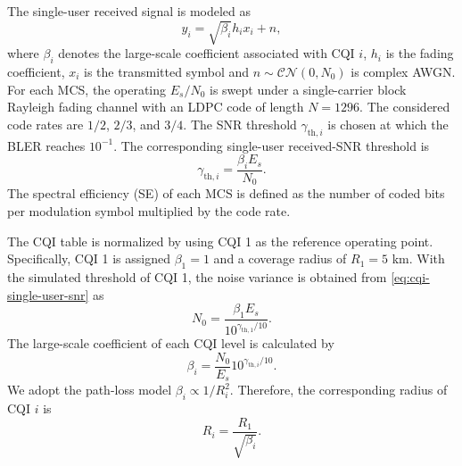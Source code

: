 The single-user received signal is modeled as
\begin{equation}
    y_i=\sqrt{\beta_i}h_i x_i+n,
\end{equation}
where $\beta_i$ denotes the large-scale coefficient associated with CQI $i$, 
$h_i$ is the fading coefficient, 
$x_i$ is the transmitted symbol and $n \sim \mathcal{CN}(0,N_0)$ is complex AWGN. 
For each MCS, the operating $E_s/N_0$ is swept under a single-carrier block Rayleigh fading channel with an LDPC code of length $N=1296$. The considered code rates are $1/2$, $2/3$, and $3/4$. The SNR threshold $\gamma_{\mathrm{th},i}$ is chosen at which the BLER reaches $10^{-1}$. 
The corresponding single-user received-SNR threshold is
\begin{equation}
    \gamma_{\mathrm{th},i}
    =
    \frac{\beta_i E_s}{N_0}.
    \label{eq:cqi-single-user-snr}
\end{equation}
The spectral efficiency (SE) of each MCS is defined as the number of coded bits per modulation symbol multiplied by the code rate.

The CQI table is normalized by using CQI 1 as the reference operating point. Specifically, CQI 1 is assigned $\beta_1=1$ and a coverage radius of $R_1=5$ km. With the simulated threshold of CQI 1, the noise variance is obtained from \eqref{eq:cqi-single-user-snr} as
\begin{equation}
    N_0
    =
    \frac{\beta_1E_s}{10^{\gamma_{\mathrm{th},1}/10}}.
\end{equation}
The large-scale coefficient of each CQI level is calculated by
\begin{equation}
    \beta_i
    =
    \frac{N_0}{E_s}10^{\gamma_{\mathrm{th},i}/10}.
\end{equation}
We adopt the path-loss model $\beta_i\propto 1/R_i^2$. Therefore, the corresponding radius of CQI $i$ is
\begin{equation}
    R_i
    =
    \frac{R_1}{\sqrt{\beta_i}}.
\end{equation}

